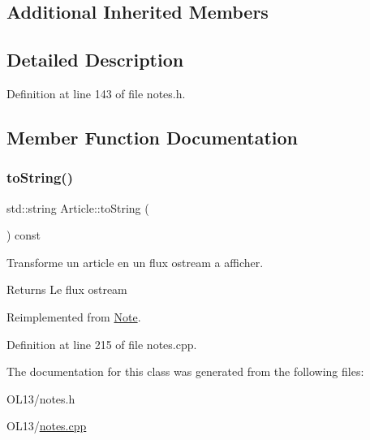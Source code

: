 \subsection*{Additional Inherited Members}


\subsection{Detailed Description}


Definition at line 143 of file notes.\+h.



\subsection{Member Function Documentation}
\mbox{\label{class_article_ae40d268ecffbaaa549968a81ea609ba4}} 
\subsubsection{\texorpdfstring{to\+String()}{toString()}}
{\footnotesize\ttfamily std\+::string Article\+::to\+String (\begin{DoxyParamCaption}{ }\end{DoxyParamCaption}) const\hspace{0.3cm}{\ttfamily [virtual]}}



Transforme un article en un flux ostream a afficher. 

\begin{DoxyReturn}{Returns}
Le flux ostream 
\end{DoxyReturn}


Reimplemented from \hyperlink{class_note_a1bd4acfbde0b71d05fd7d4ca889bca2b}{Note}.



Definition at line 215 of file notes.\+cpp.



The documentation for this class was generated from the following files\+:\begin{DoxyCompactItemize}
\item 
O\+L13/notes.\+h\item 
O\+L13/\hyperlink{notes_8cpp}{notes.\+cpp}\end{DoxyCompactItemize}
